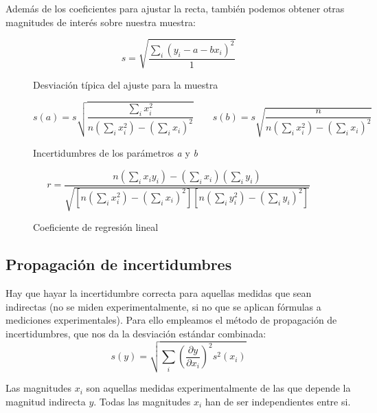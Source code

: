 \documentclass[12pt, a4paper, titlepage]{article}
\begin{document}
  Además de los coeficientes para ajustar la recta, también podemos obtener otras magnitudes de interés sobre nuestra muestra:
  \begin{figure}[H]
    \begin{equation} \label{ec:s}
      s = \sqrt{\frac{\sum_i \left ( y_i - a - bx_i \right )^2}{1}}
    \end{equation}
    \caption{Desviación típica del ajuste para la muestra}
  \end{figure}
  \begin{figure}[H]
    \begin{equation} \label{ec:sab}
      s(a) = s\sqrt{\frac{\sum_i x_i^2}{n\left ( \sum_i x_i^2 \right ) - \left ( \sum_i x_i \right )^2}} \quad \quad s(b) = s\sqrt{\frac{n}{n\left ( \sum_i x_i^2 \right ) - \left ( \sum_i x_i \right )^2}}
    \end{equation}
    \caption{Incertidumbres de los parámetros \textit{a} y \textit{b}}
  \end{figure}
  \begin{figure}[H]
    \begin{equation} \label{ec:r}
      r = \frac{n\left ( \sum_i x_i y_i \right ) - \left ( \sum_i x_i \right )\left ( \sum_i y_i \right )}{\sqrt{\left [ n\left ( \sum_i x_i^2 \right ) - \left ( \sum_i x_i \right ) ^2\right ]\left [ n\left ( \sum_i y_i^2 \right ) - \left ( \sum_i y_i \right ) ^2 \right ]}}
    \end{equation}
    \caption{Coeficiente de regresión lineal}
  \end{figure}

  \subsection{Propagación de incertidumbres}
  \label{sec:propinc}

  Hay que hayar la incertidumbre correcta para aquellas medidas que sean indirectas (no se miden experimentalmente, si no que se aplican fórmulas a mediciones experimentales). Para ello empleamos el método de propagación de incertidumbres, que nos da la desviación estándar combinada:
  \begin{equation} \label{ec:propinc}
    s(y) = \sqrt{\sum_i\left ( \frac{\partial y}{\partial x_i} \right )^2 s^2(x_i)}
  \end{equation}

  Las magnitudes $x_i$ son aquellas medidas experimentalmente de las que depende la magnitud indirecta $y$. Todas las magnitudes $x_i$ han de ser independientes entre si.
\end{document}

